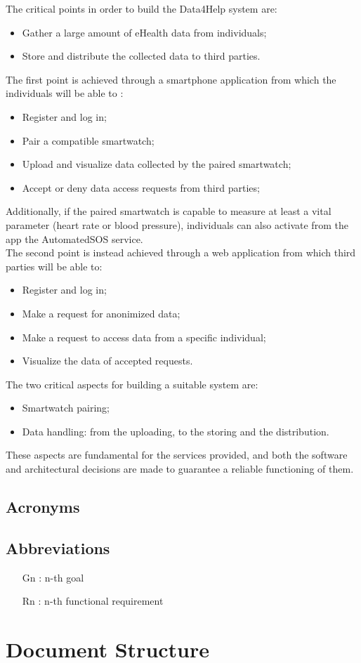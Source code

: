 The critical points in order to build the Data4Help system are:
\begin{itemize}
\item Gather a large amount of eHealth data from individuals;
\item Store and distribute the collected data to third parties.
\end{itemize}
The first point is achieved through a smartphone application from which the individuals will be able to :
\begin{itemize}
\item Register and log in;
\item Pair a compatible smartwatch;
\item Upload and visualize data collected by the paired smartwatch;
\item Accept or deny data access requests from third parties;
\end{itemize}
Additionally, if the paired smartwatch is capable to measure at least a vital parameter (heart rate or blood pressure), individuals can also activate from the app the AutomatedSOS service.
\\
The second point is instead achieved through a web application from which third parties will be able to:
\begin{itemize}
\item Register and log in;
\item Make a request for anonimized data;
\item Make a request to access data from a specific individual;
\item Visualize the data of accepted requests.
\end{itemize}

The two critical aspects for building a suitable system are:

\begin{itemize}
\item Smartwatch pairing;
\item Data handling: from the uploading, to the storing and the distribution.
\end{itemize}

These aspects are fundamental for the services provided, and both the software and architectural decisions are made to guarantee a reliable functioning of them.





\subsection{Acronyms}



\subsection{Abbreviations}
\begin{itemize}
\item[Gn]: n-th goal
\item[Rn]: n-th functional requirement
\end{itemize}



\section{Document Structure}
